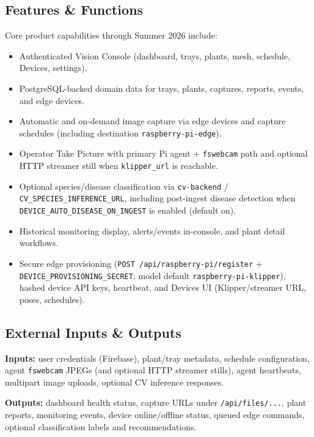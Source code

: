 \documentclass[11pt,letterpaper]{article}
\begin{document}
\subsection{Features \& Functions}
Core product capabilities through Summer 2026 include:
\begin{itemize}
  \item Authenticated Vision Console (dashboard, trays, plants, mesh, schedule, Devices, settings).
  \item PostgreSQL-backed domain data for trays, plants, captures, reports, events, and edge devices.
  \item Automatic and on-demand image capture via edge devices and capture schedules (including
        destination \texttt{raspberry-pi-edge}).
  \item Operator Take Picture with primary Pi agent + \texttt{fswebcam} path and optional HTTP
        streamer still when \texttt{klipper\_url} is reachable.
  \item Optional species/disease classification via \texttt{cv-backend} / \texttt{CV\_SPECIES\_INFERENCE\_URL},
        including post-ingest disease detection when \texttt{DEVICE\_AUTO\_DISEASE\_ON\_INGEST} is enabled
        (default on).
  \item Historical monitoring display, alerts/events in-console, and plant detail workflows.
  \item Secure edge provisioning (\texttt{POST /api/raspberry-pi/register} +
        \texttt{DEVICE\_PROVISIONING\_SECRET}; model default \texttt{raspberry-pi-klipper}), hashed
        device API keys, heartbeat, and Devices UI (Klipper/streamer URL, poses, schedules).
\end{itemize}

\subsection{External Inputs \& Outputs}
\textbf{Inputs:} user credentials (Firebase), plant/tray metadata, schedule configuration, agent
\texttt{fswebcam} JPEGs (and optional HTTP streamer stills), agent heartbeats, multipart image uploads,
optional CV inference responses.

\textbf{Outputs:} dashboard health status, capture URLs under \texttt{/api/files/...}, plant reports,
monitoring events, device online/offline status, queued edge commands, optional classification labels
and recommendations.
\end{document}
